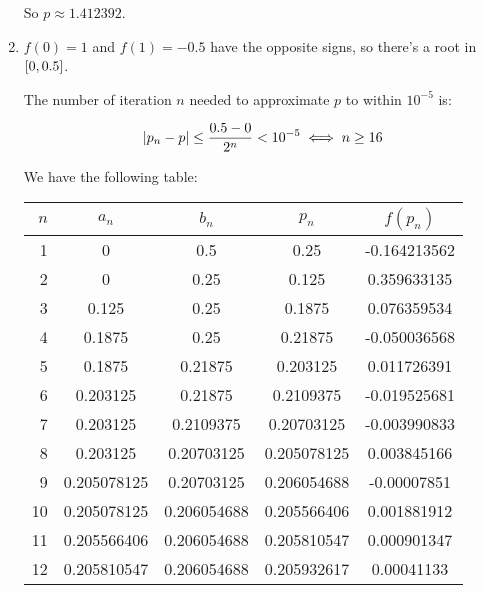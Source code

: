 \documentclass[../../Assignments.tex]{subfiles}
\begin{document}
\begin{solution}
\begin{enumerate}
            So \(p \approx \num{1.412392}\).

        \item \(f(0) = 1\) and \(f(1) = \num{-0.5}\) have the opposite signs, so
            there's a root in \(\interval{0}{\num{0.5}}\).

            The number of iteration \(n\) needed to approximate \(p\) to within
            \(10^{-5}\) is:

            \[\abs{p_n - p} \leq \frac{\num{0.5} - 0}{2^n} < 10^{-5} \iff n \geq 16\]

            We have the following table:

            \begin{table}
                \centering
                \begin{longtable}{r S[table-format=1.9] S[table-format=1.9] S[table-format=1.9] S[table-format=-1.9]}
                    \toprule
                    \(n\)  &   {\(a_n\)}   &   {\(b_n\)}   &   {\(p_n\)}   &  {\(f(p_n)\)}  \\
                      &  0            &  0.5          &  0.25         &  -0.164213562  \\
                        2  &  0            &  0.25         &  0.125        &   0.359633135  \\
                        3  &  0.125        &  0.25         &  0.1875       &   0.076359534  \\
                        4  &  0.1875       &  0.25         &  0.21875      &  -0.050036568  \\
                        5  &  0.1875       &  0.21875      &  0.203125     &   0.011726391  \\
                        6  &  0.203125     &  0.21875      &  0.2109375    &  -0.019525681  \\
                        7  &  0.203125     &  0.2109375    &  0.20703125   &  -0.003990833  \\
                        8  &  0.203125     &  0.20703125   &  0.205078125  &   0.003845166  \\
                        9  &  0.205078125  &  0.20703125   &  0.206054688  &  -0.00007851   \\
                       10  &  0.205078125  &  0.206054688  &  0.205566406  &   0.001881912  \\
                       11  &  0.205566406  &  0.206054688  &  0.205810547  &   0.000901347  \\
                       12  &  0.205810547  &  0.206054688  &  0.205932617  &   0.00041133   \\

\end{longtable}
\end{table}
\end{enumerate}
\end{solution}
\end{document}
